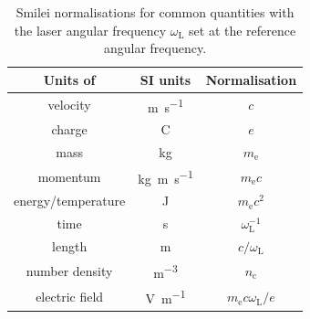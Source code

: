 \begin{table}
\begin{center}
\begin{tabular}{ccc}
	 \hline \hline
	Units of & SI units & Normalisation \\
	\hline
	velocity & \unit{m.s^{-1}} & $c$ \\
	charge & C & $e$ \\
	mass & kg & $m_\mathrm{e}$ \\
	momentum & \unit{kg.m.s^{-1}} & $m_\mathrm{e}c$ \\
	energy/temperature & J & $m_\mathrm{e}c^2$ \\
	time & s & $\omega^{-1}_\mathrm{L}$ \\
	length & m & $c/\omega_\mathrm{L}$ \\
	number density & \unit{m^{-3}} & $n_\mathrm{c}$ \\
	electric field & \unit{V.m^{-1}} & $m_\mathrm{e}c\omega_\mathrm{L}/e$ \\
	\hline \hline
\end{tabular}
	\caption{\label{tab:intro-normalisations} Smilei normalisations for common quantities with the laser angular frequency $\omega_\mathrm{L}$ set at the reference angular frequency.}
\end{center}
\end{table}




